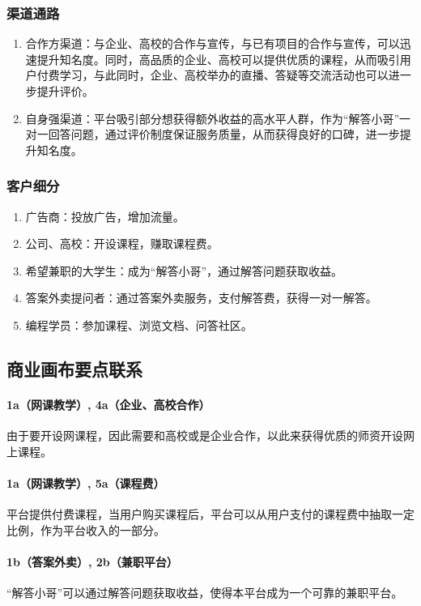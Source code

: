 \documentclass[a4paper]{ctexart}
\begin{document}
\subsubsection{渠道通路}

\begin{enumerate}[label=\alph*.]
  \item 合作方渠道：与企业、高校的合作与宣传，与已有项目的合作与宣传，可以迅速提升知名度。同时，高品质的企业、高校可以提供优质的课程，从而吸引用户付费学习，与此同时，企业、高校举办的直播、答疑等交流活动也可以进一步提升评价。
  \item 自身强渠道：平台吸引部分想获得额外收益的高水平人群，作为“解答小哥”一对一回答问题，通过评价制度保证服务质量，从而获得良好的口碑，进一步提升知名度。
\end{enumerate}

\subsubsection{客户细分}

\begin{enumerate}[label=\alph*.]
  \item 广告商：投放广告，增加流量。
  \item 公司、高校：开设课程，赚取课程费。
  \item 希望兼职的大学生：成为“解答小哥”，通过解答问题获取收益。
  \item 答案外卖提问者：通过答案外卖服务，支付解答费，获得一对一解答。
  \item 编程学员：参加课程、浏览文档、问答社区。
\end{enumerate}

\subsection{商业画布要点联系}

\paragraph{1a（网课教学）, 4a（企业、高校合作）}由于要开设网课程，因此需要和高校或是企业合作，以此来获得优质的师资开设网上课程。
\paragraph{1a（网课教学）, 5a（课程费）}平台提供付费课程，当用户购买课程后，平台可以从用户支付的课程费中抽取一定比例，作为平台收入的一部分。
\paragraph{1b（答案外卖）, 2b（兼职平台）}“解答小哥”可以通过解答问题获取收益，使得本平台成为一个可靠的兼职平台。
\end{document}
